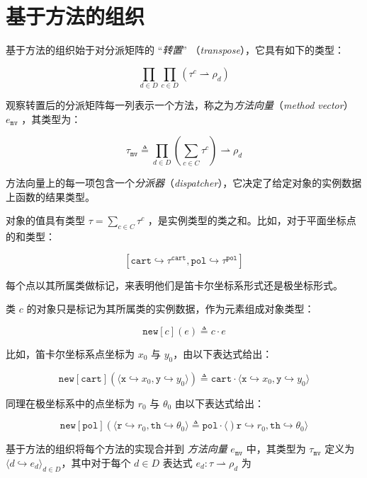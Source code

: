 \section{基于方法的组织}

基于方法的组织始于对分派矩阵的 “\textit{转置}” （\textit{transpose}），它具有如下的类型：

$$ \prod_{d \in D} \prod_{c \in D} (\tau^{c} \rightharpoonup \rho_{d}) $$

观察转置后的分派矩阵每一列表示一个方法，称之为\textit{方法向量}（\textit{method vector}）$e_{\mathtt{mv}}$ ，其类型为：

$$ \tau_{\mathtt{mv}} \triangleq \prod_{d \in D} (\sum_{c \in C} \tau^{c}) \rightharpoonup \rho_{d} $$

方法向量上的每一项包含一个\textit{分派器}（\textit{dispatcher}），它决定了给定对象的实例数据上函数的结果类型。

对象的值具有类型 $\tau = \sum_{c \in C} \tau^{c} $ ，是实例类型的类之和。比如，对于平面坐标点的和类型：

$$ [{\mathtt{cart}} \hookrightarrow \tau^{\mathtt{cart}}, {\mathtt{pol}} \hookrightarrow \tau^{\mathtt{pol}}] $$

每个点以其所属类做标记，来表明他们是笛卡尔坐标系形式还是极坐标形式。

类 $c$ 的对象只是标记为其所属类的实例数据，作为元素组成对象类型：

$$ {\mathtt{new}}[c](e) \triangleq c \cdot e $$

比如，笛卡尔坐标系点坐标为 $x_{0}$ 与 $y_{0}$，由以下表达式给出：

$$ {\mathtt{new}}[{\mathtt{cart}}](\langle {\mathtt{x}} \hookrightarrow x_{0}, {\mathtt{y}} \hookrightarrow y_{0} \rangle ) \triangleq {\mathtt{cart}} \cdot \langle {\mathtt{x}} \hookrightarrow x_{0}, {\mathtt{y}} \hookrightarrow y_{0} \rangle $$

同理在极坐标系中的点坐标为 $r_{0}$ 与 $\theta_{0}$ 由以下表达式给出：

$$ {\mathtt{new}}[{\mathtt{pol}}](\langle {\mathtt{r}} \hookrightarrow r_{0}, {\mathtt{th}} \hookrightarrow \theta_{0} \rangle \triangleq {\mathtt{pol}} \cdot \langle ) {\mathtt{r}} \hookrightarrow r_{0}, {\mathtt{th}} \hookrightarrow \theta_{0} \rangle $$

基于方法的组织将每个方法的实现合并到 \textit{方法向量} $e_{\mathtt{mv}}$ 中，其类型为 $\tau_{\mathtt{mv}}$ 定义为 $\langle d \hookrightarrow e_{d} \rangle_{d \in D}$，其中对于每个 $d \in D$ 表达式 $ e_{d} : \tau \rightharpoonup \rho_{d}$ 为

